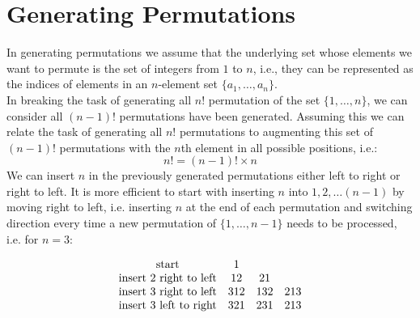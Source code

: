 \documentclass[12pt letter]{report}
\begin{document}
\section{Generating Permutations}
In generating permutations we assume that the underlying set whose elements we want to permute is the set of integers
from $1$ to $n$, i.e., they can be represented as the indices of elements in an $n$-element set $\{a_1,\ldots,a_n\} $.\\
In breaking the task of generating all $n!$ permutation of the set $\{1, \ldots, n\} $, we can consider all $ \left( n -
  1\right)! $ permutations have been generated. Assuming this we can relate the task of generating all $n!$ permutations
to augmenting this set of $ \left( n - 1 \right)! $ permutations with the $n$th element in all possible positions, i.e.:
\[
  n! = \left( n - 1 \right)! \times n
\]
We can insert $n$ in the previously generated permutations either left to right or right to left. It is more efficient
to start with inserting $n$ into $1,2,\ldots \left( n-1 \right) $ by moving right to left, i.e. inserting $n$ at the end of
each permutation and switching direction every time a new permutation of $\{1, \ldots, n - 1\} $ needs to be
processed, i.e. for $n = 3$:

\begin{align*}
  \begin{array}{c c c c}
    \text{start}                  & 1   &     &     \\
    \text{insert 2 right to left} & 12  & 21  &     \\
    \text{insert 3 right to left} & 312 & 132 & 213 \\
    \text{insert 3 left to right} & 321 & 231 & 213
  \end{array}
\end{align*}
\end{document}
